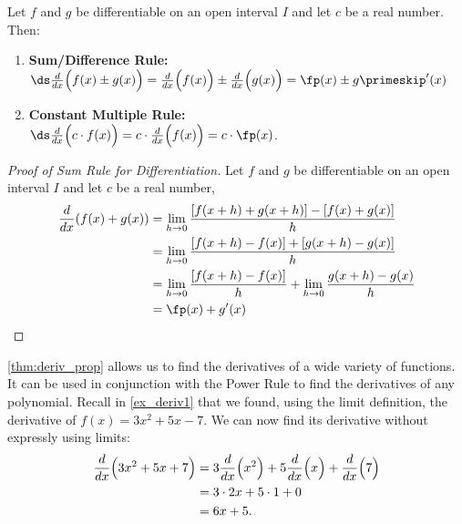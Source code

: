 \begin{theorem}\label{thm:deriv_prop}
Let $f$ and $g$ be differentiable on an open interval $I$ and let $c$ be a real number. Then:
\begin{enumerate}
	\item	\textbf{Sum/Difference Rule:}\\
	\qquad$\ds \frac{d}{dx}\Bigl(f(x) \pm g(x)\Bigr) = \frac{d}{dx}\Bigl(f(x)\Bigr) \pm \frac{d}{dx}\Bigl(g(x)\Bigr)=\fp(x)\pm g\primeskip'(x)$
	\item	\textbf{Constant Multiple Rule:}\\
	\qquad$\ds \frac{d}{dx}\Bigl(c\cdot f(x)\Bigr) = c\cdot\frac{d}{dx}\Bigl(f(x)\Bigr) = c\cdot\fp(x)$.
\end{enumerate}
\end{theorem}

\begin{proof}[Proof of Sum Rule for Differentiation]
Let $f$ and $g$ be differentiable on an open interval $I$ and let $c$ be a real number,
\begin{align*}
\frac{d}{dx}( f(x) + g(x))
&= \lim_{h\to 0} \frac{[f(x+h)+g(x+h)] - [f(x)+g(x)]}{h} \\
&= \lim_{h\to 0} \frac{[f(x+h)-f(x)] + [g(x+h) - g(x)]}{h} \\
&= \lim_{h\to 0} \frac{[f(x+h)-f(x)]}{h} + \lim_{h\to 0}\frac {g(x+h) - g(x)}{h}\\
&= \fp(x) + g'(x)\qedhere
\end{align*}
\end{proof}


\autoref{thm:deriv_prop} allows us to find the derivatives of a wide variety of functions. It can be used in conjunction with the Power Rule to find the derivatives of any polynomial. Recall in \autoref{ex_deriv1} that we found, using the limit definition, the derivative of $f(x) = 3x^2+5x-7$. We can now find its derivative without expressly using limits:
\begin{align*}
	\frac{d}{dx}\Bigl(3x^2+5x+7\Bigr)
	&= 3\frac{d}{dx}\Bigl(x^2\Bigr) + 5\frac{d}{dx}\Bigl(x\Bigr) + \frac{d}{dx}\Bigl(7\Bigr) \\
	&= 3\cdot 2x+5\cdot 1+ 0\\
	&= 6x+5.
\end{align*}

